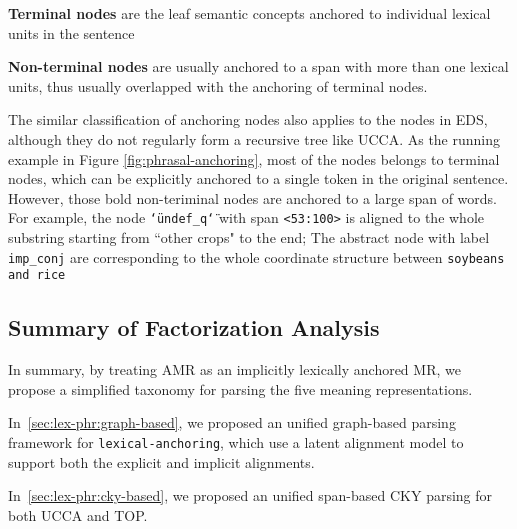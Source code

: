 \begin{inparaenum}
\item \textbf{Terminal nodes} are the leaf semantic
  concepts anchored to individual lexical units in the sentence

\item \textbf{Non-terminal nodes} are usually anchored to a span with
  more than one lexical units, thus usually overlapped with the
  anchoring of terminal nodes.
\end{inparaenum}

The similar classification of anchoring nodes also applies to the
nodes in EDS, although they do not regularly form a recursive tree
like UCCA. As the running example in Figure
\ref{fig:phrasal-anchoring}, most of the nodes belongs to terminal
nodes, which can be explicitly anchored to a single token in the
original sentence. However, those bold non-teriminal nodes are
anchored to a large span of words. For example, the node
\texttt{\char`\"undef\_q\char`\"} with span \texttt{<53:100>} is
aligned to the whole substring starting from ``other crops" to the
end; The abstract node with label \texttt{imp\_conj} are corresponding
to the whole coordinate structure between \texttt{soybeans and rice}

\subsection{Summary of Factorization Analysis}
\label{ssec:lex-phr:summary-anchoring}

In summary, by treating AMR as an implicitly lexically anchored MR, we
propose a simplified taxonomy for parsing the five meaning
representations.

In~\autoref{sec:lex-phr:graph-based}, we proposed an unified
graph-based parsing framework for \texttt{lexical-anchoring}, which
use a latent alignment model to support both the explicit and implicit
alignments.

In~\autoref{sec:lex-phr:cky-based}, we proposed an unified span-based
CKY parsing for both UCCA and TOP.

